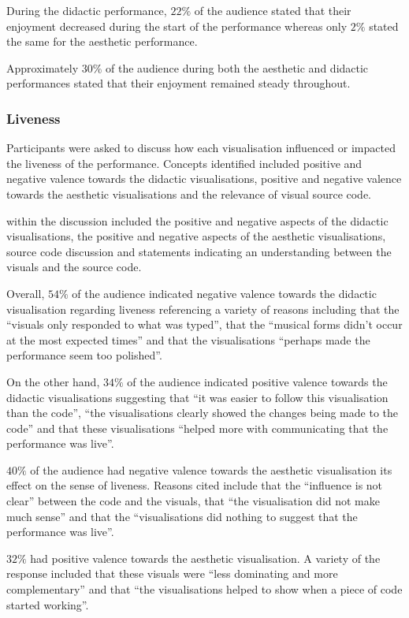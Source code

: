 \documentclass{sig-alternate}
\begin{document}
During the didactic performance, $22\%$ of the audience stated that their enjoyment decreased during the start of the performance whereas only $2\%$ stated the same for the aesthetic performance.

Approximately $30\%$ of the audience during both the aesthetic and didactic performances stated that their enjoyment remained steady throughout.

\subsubsection{Liveness}

Participants were asked to discuss how each visualisation influenced or impacted the liveness of the performance. Concepts identified included positive and negative valence towards the didactic visualisations, positive and negative valence towards the aesthetic visualisations and the relevance of visual source code. 

within the discussion included the positive and negative aspects of the didactic visualisations, the positive and negative aspects of the aesthetic visualisations, source code discussion and statements indicating an understanding between the visuals and the source code.

Overall, $54\%$ of the audience indicated negative valence towards the didactic visualisation regarding liveness referencing a variety of reasons including that the ``visuals only responded to what was typed'', that the ``musical forms didn't occur at the most expected times'' and that the visualisations ``perhaps made the performance seem too polished''.

On the other hand, $34\%$ of the audience indicated positive valence towards the didactic visualisations suggesting that ``it was easier to follow this visualisation than the code'', ``the visualisations clearly showed the changes being made to the code'' and that these visualisations ``helped more with communicating that the performance was live''.

$40\%$ of the audience had negative valence towards the aesthetic visualisation its effect on the sense of liveness. Reasons cited include that the ``influence is not clear'' between the code and the visuals, that ``the visualisation did not make much sense'' and that the ``visualisations did nothing to suggest that the performance was live''.

$32\%$ had positive valence towards the aesthetic visualisation. A variety of the response included that these visuals were ``less dominating and more complementary'' and that ``the visualisations helped to show when a piece of code started working''.
\end{document}
